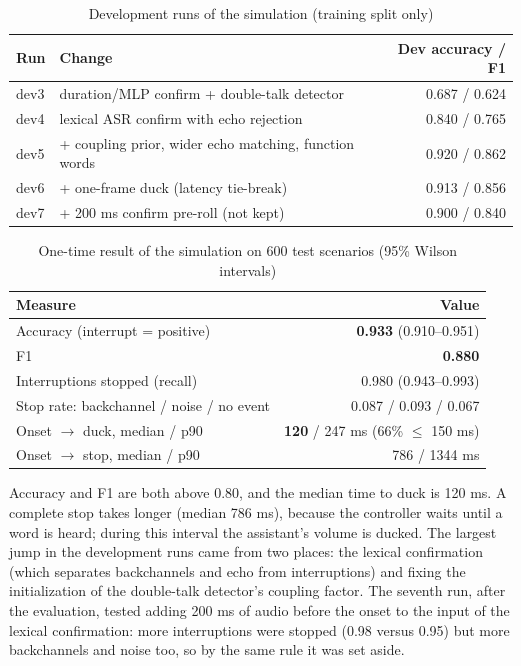 \begin{table}[ht]
\centering
\caption{Development runs of the simulation (training split only)}
\label{tab:bargein-dev}
\small
\begin{tabular}{llr}
\toprule
Run & Change & Dev accuracy / F1 \\
\midrule
dev3 & duration/MLP confirm + double-talk detector & 0.687 / 0.624 \\
dev4 & lexical ASR confirm with echo rejection & 0.840 / 0.765 \\
dev5 & + coupling prior, wider echo matching, function words & 0.920 / 0.862 \\
dev6 & + one-frame duck (latency tie-break) & 0.913 / 0.856 \\
dev7 & + 200 ms confirm pre-roll (not kept) & 0.900 / 0.840 \\
\bottomrule
\end{tabular}
\end{table}

\begin{table}[ht]
\centering
\caption{One-time result of the simulation on 600 test scenarios (95\% Wilson intervals)}
\label{tab:bargein-sim}
\small
\begin{tabular}{lr}
\toprule
Measure & Value \\
\midrule
Accuracy (interrupt = positive) & \textbf{0.933} (0.910--0.951) \\
F1 & \textbf{0.880} \\
Interruptions stopped (recall) & 0.980 (0.943--0.993) \\
Stop rate: backchannel / noise / no event & 0.087 / 0.093 / 0.067 \\
Onset $\rightarrow$ duck, median / p90 & \textbf{120} / 247 ms (66\% $\le$ 150 ms) \\
Onset $\rightarrow$ stop, median / p90 & 786 / 1344 ms \\
\bottomrule
\end{tabular}
\end{table}

Accuracy and F1 are both above 0.80, and the median time to duck is 120 ms. A complete stop
takes longer (median 786 ms), because the controller waits until a word is heard; during
this interval the assistant's volume is ducked. The largest jump in the development runs
came from two places: the lexical confirmation (which separates backchannels and echo from
interruptions) and fixing the initialization of the double-talk detector's coupling
factor. The seventh run, after the evaluation, tested adding 200 ms of audio before the
onset to the input of the lexical confirmation: more interruptions were stopped (0.98
versus 0.95) but more backchannels and noise too, so by the same rule it was set aside.

